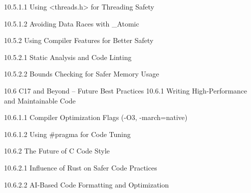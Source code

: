 10.5.1.1 Using <threads.h> for Threading Safety

10.5.1.2 Avoiding Data Races with _Atomic

10.5.2 Using Compiler Features for Better Safety

10.5.2.1 Static Analysis and Code Linting

10.5.2.2 Bounds Checking for Safer Memory Usage

10.6 C17 and Beyond – Future Best Practices
10.6.1 Writing High-Performance and Maintainable Code

10.6.1.1 Compiler Optimization Flags (-O3, -march=native)

10.6.1.2 Using #pragma for Code Tuning

10.6.2 The Future of C Code Style

10.6.2.1 Influence of Rust on Safer Code Practices

10.6.2.2 AI-Based Code Formatting and Optimization

